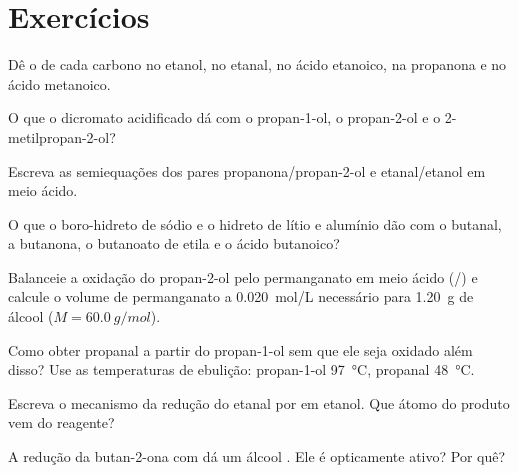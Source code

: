 \section{Exercícios}

\begin{exercise}[$\star$]\label{exo:b1:organic-redox:1}
Dê o  de cada carbono no etanol, no etanal, no ácido
etanoico, na propanona e no ácido metanoico.
\end{exercise}

\begin{exercise}[$\star$]\label{exo:b1:organic-redox:2}
O que o dicromato acidificado dá com o propan-1-ol, o propan-2-ol e o
2-metilpropan-2-ol?
\end{exercise}

\begin{exercise}[$\star$]\label{exo:b1:organic-redox:3}
Escreva as semiequações dos pares propanona/propan-2-ol e
etanal/etanol em meio ácido.
\end{exercise}

\begin{exercise}[$\star$]\label{exo:b1:organic-redox:4}
O que o boro-hidreto de sódio e o hidreto de lítio e alumínio dão com o
butanal, a butanona, o butanoato de etila e o ácido butanoico?
\end{exercise}

\begin{exercise}[$\star\star$]\label{exo:b1:organic-redox:5}
Balanceie a oxidação do propan-2-ol pelo permanganato em meio ácido
(/) e calcule o volume de permanganato a
\qty{0.020}{mol/L} necessário para \qty{1.20}{g} de álcool ($M = \qty{60.0}{g/mol}$).
\end{exercise}

\begin{exercise}[$\star\star$]\label{exo:b1:organic-redox:6}
Como obter propanal a partir do propan-1-ol sem que ele seja oxidado
além disso? Use as temperaturas de ebulição: propan-1-ol \qty{97}{\celsius}, propanal
\qty{48}{\celsius}.
\end{exercise}

\begin{exercise}[$\star\star$]\label{exo:b1:organic-redox:7}
Escreva o mecanismo da redução do etanal por  em etanol.
Que átomo do produto vem do reagente?
\end{exercise}

\begin{exercise}[$\star\star$]\label{exo:b1:organic-redox:8}
A redução da butan-2-ona com  dá um álcool . Ele é
opticamente ativo? Por quê?
\end{exercise}

